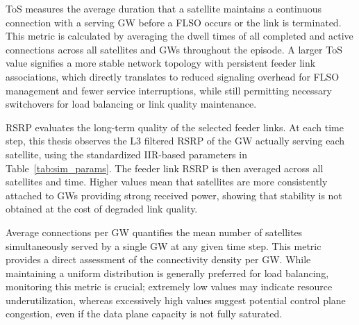 ToS measures the average duration that a satellite maintains a continuous connection with a serving GW before a FLSO occurs or the link is terminated. This metric is calculated by averaging the dwell times of all completed and active connections across all satellites and GWs throughout the episode. A larger ToS value signifies a more stable network topology with persistent feeder link associations, which directly translates to reduced signaling overhead for FLSO management and fewer service interruptions, while still permitting necessary switchovers for load balancing or link quality maintenance.

RSRP evaluates the long-term quality of the selected feeder links. At each time step, this thesis observes the L3 filtered RSRP of the GW actually serving each satellite, using the standardized IIR-based parameters in Table~\ref{tab:sim_params}. The feeder link RSRP is then averaged across all satellites and time. Higher values mean that satellites are more consistently attached to GWs providing strong received power, showing that stability is not obtained at the cost of degraded link quality.

Average connections per GW quantifies the mean number of satellites simultaneously served by a single GW at any given time step. This metric provides a direct assessment of the connectivity density per GW. While maintaining a uniform distribution is generally preferred for load balancing, monitoring this metric is crucial; extremely low values may indicate resource underutilization, whereas excessively high values suggest potential control plane congestion, even if the data plane capacity is not fully saturated.

